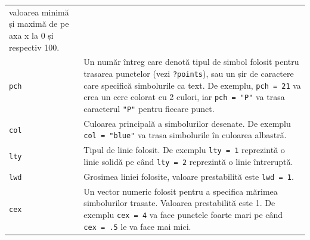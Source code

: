 \documentclass[]{article}
\begin{document}
\begin{longtable}[]{@{}ll@{}}
\begin{minipage}[t]{0.67\columnwidth}
valoarea minimă și maximă de pe axa x la 0 și respectiv 100.\strut
\end{minipage}\tabularnewline
\begin{minipage}[t]{0.18\columnwidth}\raggedright\strut
\texttt{pch}\strut
\end{minipage} & \begin{minipage}[t]{0.67\columnwidth}\raggedright\strut
Un număr întreg care denotă tipul de simbol folosit pentru trasarea
punctelor (vezi \texttt{?points}), sau un șir de caractere care
specifică simbolurile ca text. De exemplu, \texttt{pch\ =\ 21} va crea
un cerc colorat cu 2 culori, iar \texttt{pch\ =\ "P"} va trasa
caracterul \texttt{"P"} pentru fiecare punct.\strut
\end{minipage}\tabularnewline
\begin{minipage}[t]{0.18\columnwidth}\raggedright\strut
\texttt{col}\strut
\end{minipage} & \begin{minipage}[t]{0.67\columnwidth}\raggedright\strut
Culoarea principală a simbolurilor desenate. De exemplu
\texttt{col\ =\ "blue"} va trasa simbolurile în culoarea albastră.\strut
\end{minipage}\tabularnewline
\begin{minipage}[t]{0.18\columnwidth}\raggedright\strut
\texttt{lty}\strut
\end{minipage} & \begin{minipage}[t]{0.67\columnwidth}\raggedright\strut
Tipul de linie folosit. De exemplu \texttt{lty\ =\ 1} reprezintă o linie
solidă pe când \texttt{lty\ =\ 2} reprezintă o linie întreruptă.\strut
\end{minipage}\tabularnewline
\begin{minipage}[t]{0.18\columnwidth}\raggedright\strut
\texttt{lwd}\strut
\end{minipage} & \begin{minipage}[t]{0.67\columnwidth}\raggedright\strut
Grosimea liniei folosite, valoare prestabilită este
\texttt{lwd\ =\ 1}.\strut
\end{minipage}\tabularnewline
\begin{minipage}[t]{0.18\columnwidth}\raggedright\strut
\texttt{cex}\strut
\end{minipage} & \begin{minipage}[t]{0.67\columnwidth}\raggedright\strut
Un vector numeric folosit pentru a specifica mărimea simbolurilor
trasate. Valoarea prestabilită este 1. De exemplu \texttt{cex\ =\ 4} va
face punctele foarte mari pe când \texttt{cex\ =\ .5} le va face mai
mici.\strut
\end{minipage}\tabularnewline
\bottomrule
\end{longtable}
\end{document}
